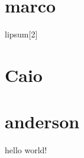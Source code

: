 
    \section{marco}
    lipsum[2]
    \section{Caio}
    
    \section{anderson}
     hello world!


